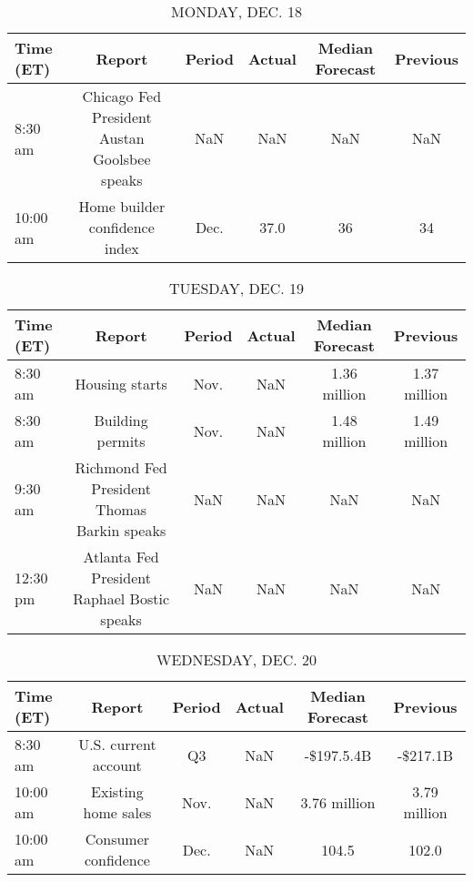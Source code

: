 \documentclass{article}%
\begin{document}
%
\normalsize%


\begin{table}[htbp]%
\caption{MONDAY, DEC. 18}%
\centering%
\begin{adjustbox}{width=1\textwidth}%
\begin{tabular}{lccccc}
\toprule
Time (ET) &                                       Report & Period &  Actual & Median Forecast & Previous \\
\midrule
  8:30 am & Chicago Fed President Austan Goolsbee speaks &    NaN &     NaN &             NaN &      NaN \\
 10:00 am &                Home builder confidence index &   Dec. &    37.0 &              36 &       34 \\
\bottomrule
\end{tabular}
%
\end{adjustbox}%
\end{table}

%


\begin{table}[htbp]%
\caption{TUESDAY, DEC. 19}%
\centering%
\begin{adjustbox}{width=1\textwidth}%
\begin{tabular}{lccccc}
\toprule
Time (ET) &                                      Report & Period & Actual & Median Forecast &     Previous \\
\midrule
  8:30 am &                              Housing starts &   Nov. &    NaN &    1.36 million & 1.37 million \\
  8:30 am &                            Building permits &   Nov. &    NaN &    1.48 million & 1.49 million \\
  9:30 am & Richmond Fed President Thomas Barkin speaks &    NaN &    NaN &             NaN &          NaN \\
 12:30 pm & Atlanta Fed President Raphael Bostic speaks &    NaN &    NaN &             NaN &          NaN \\
\bottomrule
\end{tabular}
%
\end{adjustbox}%
\end{table}

%


\begin{table}[htbp]%
\caption{WEDNESDAY, DEC. 20}%
\centering%
\begin{adjustbox}{width=1\textwidth}%
\begin{tabular}{lccccc}
\toprule
Time (ET) &               Report & Period & Actual & Median Forecast &     Previous \\
\midrule
  8:30 am & U.S. current account &     Q3 &    NaN &      -\$197.5.4B &     -\$217.1B \\
 10:00 am &  Existing home sales &   Nov. &    NaN &    3.76 million & 3.79 million \\
 10:00 am &  Consumer confidence &   Dec. &    NaN &           104.5 &        102.0 \\
\bottomrule
\end{tabular}
%
\end{adjustbox}%
\end{table}
\end{document}
